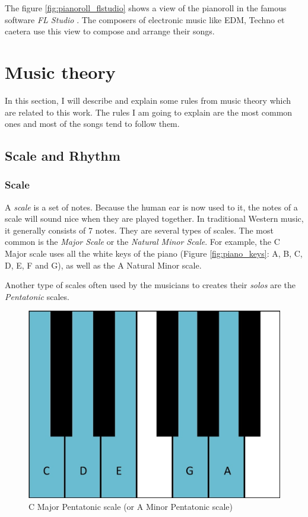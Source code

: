\documentclass[12pt]{report}
\begin{document}
The figure \ref{fig:pianoroll_flstudio} shows a view of the pianoroll in the famous software \textit{FL Studio} \cite{noauthor_fl_nodate}. The composers of electronic music like EDM, Techno et caetera use this view to compose and arrange their songs.


\section{Music theory}
\label{sec:back:music-theory}

In this section, I will describe and explain some rules from music theory which are related to this work. The rules I am going to explain are the most common ones and most of the songs tend to follow them.

\subsection{Scale and Rhythm}

\subsubsection{Scale}

A \textit{scale} is a set of notes. Because the human ear is now used to it, the notes of a scale will sound nice when they are played together. In traditional Western music, it generally consists of 7 notes. They are several types of scales.
The most common is the \textit{Major Scale} or the \textit{Natural Minor Scale}. For example, the C Major scale uses all the white keys of the piano (Figure \ref{fig:piano_keys}: A, B, C, D, E, F and G), as well as the A Natural Minor scale.

Another type of scales often used by the musicians to creates their \textit{solos} are the \textit{Pentatonic} scales.


\begin{figure}[H]
    \centering
    \includegraphics[width=0.5 \textwidth]{images/music/piano/pentatonic_scale.jpg}
    \caption{C Major Pentatonic scale (or A Minor Pentatonic scale)}
    \label{fig:pentatonic_scale_piano}
\end{figure}
\end{document}

